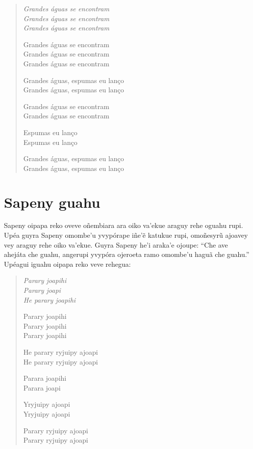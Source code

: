 \begin{verse}
\itshape
Grandes águas se encontram\\
Grandes águas se encontram\\
Grandes águas se encontram

Grandes águas se encontram\\
Grandes águas se encontram\\
Grandes águas se encontram

Grandes águas, espumas eu lanço\\
Grandes águas, espumas eu lanço

Grandes águas se encontram\\
Grandes águas se encontram

Espumas eu lanço\\
Espumas eu lanço \EP[1]

Grandes águas, espumas eu lanço\\
Grandes águas, espumas eu lanço
\end{verse}

\chapter{Sapeny guahu}

 Sapeny oipapa reko oveve oñembiara ara oiko va'ekue araguy rehe
oguahu rupi. Upéa guyra Sapeny omombe'u yvypórape iñe'ẽ katukue rupi,
omoñesyrũ ajoavey vey araguy rehe oiko va'ekue. Guyra Sapeny he'i
araka'e ojoupe: ``Che ave ahejáta che guahu, angerupi yvypóra ojeroeta
ramo omombe'u haguã che guahu.'' Upéagui iguahu oipapa reko veve
rehegua:

\begin{verse}
\itshape
Parary joapihi\\
Parary joapi\\
He parary joapihi

Parary joapihi\\
Parary joapihi\\
Parary joapihi

He parary ryjuipy ajoapi\\
He parary ryjuipy ajoapi

Parara joapihi\\
Parara joapi

Yryjuipy ajoapi\\
Yryjuipy ajoapi

Parary ryjuipy ajoapi\\
Parary ryjuipy ajoapi
\end{verse}

